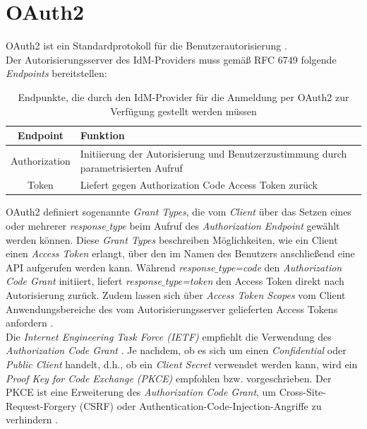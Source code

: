 \section{OAuth2}
\label{auth:oauth2}

OAuth2 ist ein Standardprotokoll für die Benutzerautorisierung \cite{rfc6749}. \\ 

Der Autorisierungsserver des IdM-Providers muss gemäß RFC 6749 folgende \textit{Endpoints} bereitstellen:

\begin{table}[htb]
    \begin{tabularx}{\textwidth}{|c|X|}
        \hline
\textbf{Endpoint} & \textbf{Funktion} \\ \hline
Authorization & Initiierung der Autorisierung und Benutzerzustimmung durch parametrisierten Aufruf \\ \hline
Token & Liefert gegen Authorization Code Access Token zurück \\ \hline
    \end{tabularx}

        \caption{Endpunkte, die durch den IdM-Provider für die Anmeldung per OAuth2 zur Verfügung gestellt werden müssen}
        \label{tab:auth:endpoints}
\end{table}

OAuth2 definiert sogenannte \textit{Grant Types}, die vom \textit{Client} über das Setzen eines oder mehrerer \textit{response$\_$type} beim Aufruf des \textit{Authorization Endpoint} gewählt werden können. 
Diese \textit{Grant Types} beschreiben Möglichkeiten, wie ein Client einen \textit{Access Token} erlangt, über den im Namen des Benutzers anschließend eine API aufgerufen werden kann. 
Während \textit{response$\_$type=code} den \textit{Authorization Code Grant} initiiert, liefert \textit{response$\_$type=token} den Access Token direkt nach Autorisierung zurück. 
Zudem lassen sich über \textit{Access Token Scopes} vom Client Anwendungsbereiche des vom Autorisierungsserver gelieferten Access Tokens anfordern \cite[Abschnitt~3.3]{rfc6749}. \\

Die \textit{Internet Engineering Task Force (IETF)} empfiehlt die Verwendung des \textit{Authorization Code Grant} \cite[Unterabschnitt~2.1.1]{ietf-oauth-security-topics-18}. 
Je nachdem, ob es sich um einen \textit{Confidential} oder \textit{Public Client} handelt, d.h., ob ein \textit{Client Secret} verwendet werden kann, wird ein \textit{Proof Key for Code Exchange (PKCE)} empfohlen bzw. vorgeschrieben. 
Der PKCE ist eine Erweiterung des \textit{Authorization Code Grant}, um Cross-Site-Request-Forgery (CSRF) oder Authentication-Code-Injection-Angriffe zu verhindern \cite{rfc7636}. \\

